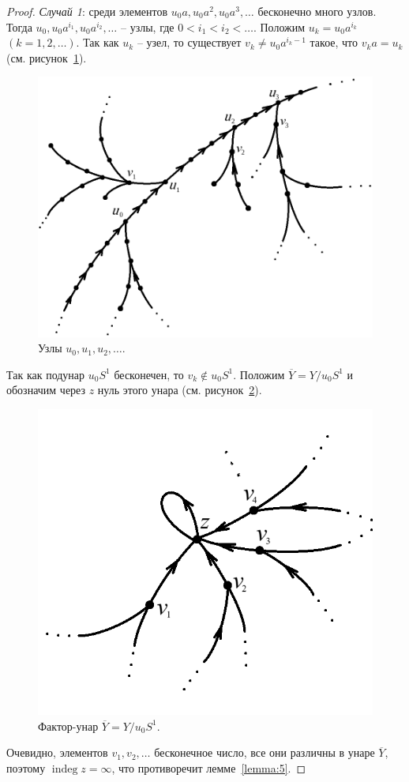 \documentclass[11pt,twoside,final
]{article}
\def\indeg{\operatorname{indeg}}
\begin{document}
\begin{proof}
	\textit{Случай 1}: среди элементов $u_0 a, u_0 a^2, u_0 a^3, \ldots$ бесконечно много узлов.
	Тогда $u_0, u_0 a^{i_1}, u_0 a^{i_2}, \ldots$ -- узлы, где $0 < i_1 < i_2 < \ldots$.
	Положим $u_k = u_0 a^{i_k}$ $(k=1,2,\ldots)$.
	Так как $u_k$ -- узел, то существует $v_k \neq u_0 a^{i_k - 1}$ такое, что $v_k a = u_k$ (см. рисунок~\ref{fig:uzly_2}).
	\begin{figure}[ht!]
		\centering
		\includegraphics[scale=0.5]{img/uzly_2.png}
		\caption{Узлы $u_0, u_1, u_2, \ldots$.}
		\label{fig:uzly_2}
	\end{figure}
	Так как подунар $u_0 S^1$ бесконечен, то $v_k \notin u_0 S^1$.
	Положим $\overline{Y} = Y / u_0 S^1$ и обозначим через $z$ нуль этого унара (см. рисунок~\ref{fig:uzly_3}).
	\begin{figure}[ht!]
		\centering
		\includegraphics[scale=0.6]{img/uzly_3.png}
		\caption{Фактор-унар $\overline{Y} = Y / u_0 S^1$.}
		\label{fig:uzly_3}
	\end{figure}
	Очевидно, элементов $v_1, v_2, \ldots$ бесконечное число, все они различны в унаре $\overline{Y}$, поэтому $\indeg z = \infty$, что противоречит лемме~\ref{lemma:5}.


\end{proof}
\end{document}
